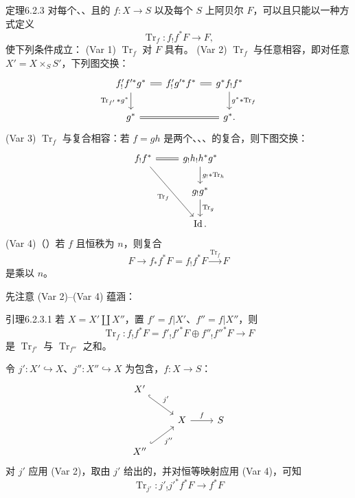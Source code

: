 \begin{SGAresult}{定理}{6.2.3}
对每个、、且的 $f:X\to S$ 以及每个 $S$ 上阿贝尔 $F$，可以且只能以一种方式定义
\[\operatorname{Tr}_f:f_!f^*F\longrightarrow F,\]
使下列条件成立：
(Var 1) $\operatorname{Tr}_f$ 对 $F$ 具有。
(Var 2) $\operatorname{Tr}_f$ 与任意相容，即对任意 $X'=X\times_S S'$，下列图交换：
\[\begin{tikzcd}[column sep=small]f'_!f'^*g^*\arrow[r,equal]\arrow[d,"\operatorname{Tr}_{f'}*g^*"']&f'_!g'^*f^*\arrow[r,equal]&g^*f_!f^*\arrow[d,"g^**\operatorname{Tr}_f"]\\g^*\arrow[rr,equal]&&g^* .\end{tikzcd}\]
(Var 3) $\operatorname{Tr}_f$ 与复合相容：若 $f=gh$ 是两个、、、的复合，则下图交换：
\[\begin{tikzcd}f_!f^*\arrow[r,equal]\arrow[ddr,"\operatorname{Tr}_f"']&g_!h_!h^*g^*\arrow[d,"g_!*\operatorname{Tr}_h"]\\&g_!g^*\arrow[d,"\operatorname{Tr}_g"]\\&\operatorname{Id}.\end{tikzcd}\]
(Var 4)（）若 $f$ 且恒秩为 $n$，则复合
\[F\longrightarrow f_*f^*F=f_!f^*F\xrightarrow{\operatorname{Tr}_f}F\]
是乘以 $n$。
\end{SGAresult}
先注意 (Var 2)--(Var 4) 蕴涵：
\begin{SGAresult}{引理}{6.2.3.1}
若 $X=X'\amalg X''$，置 $f'=f|X'$、$f''=f|X''$，则
\[\operatorname{Tr}_f:f_!f^*F=f'_!f'^*F\oplus f''_!f''^*F\longrightarrow F\]
是 $\operatorname{Tr}_{f'}$ 与 $\operatorname{Tr}_{f''}$ 之和。
\end{SGAresult}
令 $j':X'\hookrightarrow X$、$j'':X''\hookrightarrow X$ 为包含，$f:X\to S$：
\[\begin{tikzcd}X'\arrow[dr,hook,"j'"]&&\\&X\arrow[r,"f"]&S\\X''\arrow[ur,hook,"j''"']&&\end{tikzcd}\]
对 $j'$ 应用 (Var 2)，取由 $j'$ 给出的，并对恒等映射应用 (Var 4)，可知
\[\operatorname{Tr}_{j'}:j'_!j'^*f^*F\longrightarrow f^*F\]

